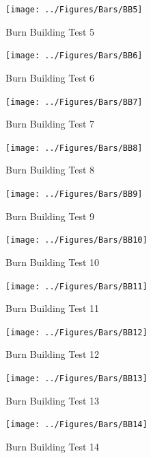 \documentclass[12pt,oneside]{book}
\begin{document}
\clearpage

\begin{figure}[!ht]
	\texttt{[image: ../Figures/Bars/BB5]}
	\caption{Burn Building Test 5}
	\label{fig:Burn_Building_Test_5}
\end{figure}

\begin{figure}[!ht]
	\texttt{[image: ../Figures/Bars/BB6]}
	\caption{Burn Building Test 6}
	\label{fig:Burn_Building_Test_6}
\end{figure}

\begin{figure}[!ht]
	\texttt{[image: ../Figures/Bars/BB7]}
	\caption{Burn Building Test 7}
	\label{fig:Burn_Building_Test_7}
\end{figure}

\begin{figure}[!ht]
	\texttt{[image: ../Figures/Bars/BB8]}
	\caption{Burn Building Test 8}
	\label{fig:Burn_Building_Test_8}
\end{figure}

\clearpage

\begin{figure}[!ht]
	\texttt{[image: ../Figures/Bars/BB9]}
	\caption{Burn Building Test 9}
	\label{fig:Burn_Building_Test_9}
\end{figure}

\begin{figure}[!ht]
	\texttt{[image: ../Figures/Bars/BB10]}
	\caption{Burn Building Test 10}
	\label{fig:Burn_Building_Test_10}
\end{figure}

\begin{figure}[!ht]
	\texttt{[image: ../Figures/Bars/BB11]}
	\caption{Burn Building Test 11}
	\label{fig:Burn_Building_Test_11}
\end{figure}

\begin{figure}[!ht]
	\texttt{[image: ../Figures/Bars/BB12]}
	\caption{Burn Building Test 12}
	\label{fig:Burn_Building_Test_12}
\end{figure}

\clearpage

\begin{figure}[!ht]
	\texttt{[image: ../Figures/Bars/BB13]}
	\caption{Burn Building Test 13}
	\label{fig:Burn_Building_Test_13}
\end{figure}

\begin{figure}[!ht]
	\texttt{[image: ../Figures/Bars/BB14]}
	\caption{Burn Building Test 14}
	\label{fig:Burn_Building_Test_14}
\end{figure}
\end{document}
